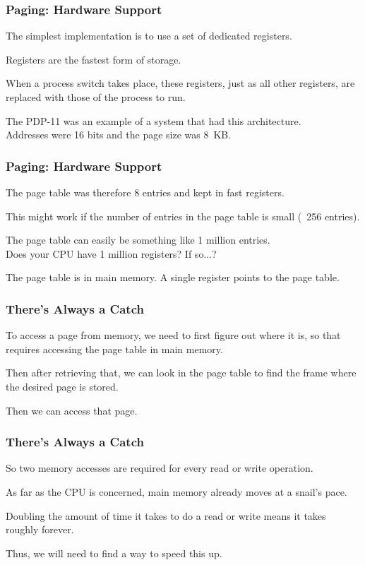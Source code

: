 \begin{frame}
\frametitle{Paging: Hardware Support}

The simplest implementation is to use a set of dedicated registers.

Registers are the fastest form of storage. 

When a process switch takes place, these registers, just as all other registers, are replaced with those of the process to run. 

The PDP-11 was an example of a system that had this architecture.\\
\quad Addresses were 16 bits and the page size was 8~KB.

\end{frame}

\begin{frame}
\frametitle{Paging: Hardware Support}

The page table was therefore 8 entries and kept in fast registers. 

This might work if the number of entries in the page table is small (~256 entries). 

The page table can easily be something like 1 million entries.\\
\quad Does your CPU have 1 million registers? If so...?

The page table is in main memory. A single register points to the page table.


\end{frame}

\begin{frame}
\frametitle{There's Always a Catch}

To access a page from memory, we need to first figure out where it is, so that requires accessing the page table in main memory. 

Then after retrieving that, we can look in the page table to find the frame where the desired page is stored. 

Then we can access that page. 

\end{frame}

\begin{frame}
\frametitle{There's Always a Catch}

So two memory accesses are required for every read or write operation. 

As far as the CPU is concerned, main memory already moves at a snail's pace. 

Doubling the amount of time it takes to do a read or write means it takes roughly forever. 

Thus, we will need to find a way to speed this up.

\end{frame}


